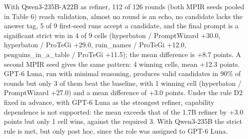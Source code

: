 \documentclass{ieeeaccess}
\begin{document}
\begin{table}[htbp]
\centering
\footnotesize
\caption{Refiner capability on the nine Tier-1 seed-42 cells; the target stays Qwen3-1.7B. Validated is the share of rounds reaching validation. Runs changed, strict wins and the strict mean refer to the final prompt versus P0 under strict extraction; the last two columns give wins/losses and the mean difference under lenient extraction. Rows marked † pool up to three MPIR seeds, the others use MPIR seed 1 only; read the † rows as pooled and not as seed-1 results.}
\end{table}

With Qwen3-235B-A22B as refiner, 112 of 126 rounds (both MPIR seeds pooled in Table 6) reach validation, almost no round is an echo, no candidate lacks the answer tag, 5 of 9 first-seed runs accept a candidate, and the final prompt is a significant strict win in 4 of 9 cells (hyperbaton / PromptWizard +30.0, hyperbaton / ProTeGi +29.0, ruin\_\allowbreak{}names / ProTeGi +12.0, penguins\_\allowbreak{}in\_\allowbreak{}a\_\allowbreak{}table / ProTeGi +11.5); the mean difference is +8.7 points. A second MPIR seed gives the same pattern: 4 winning cells, mean +12.3 points. GPT-6 Luna, run with minimal reasoning, produces valid candidates in 90\% of rounds but only 3 of them beat the baseline, with 1 winning cell (hyperbaton / PromptWizard +27.0) and a mean difference of +3.0 points. Under the rule D2 fixed in advance, with GPT-6 Luna as the strongest refiner, capability dependence is not supported: the mean exceeds that of the 1.7B refiner by +3.0 points but only 1 cell wins, against the required 3. With Qwen3-235B the strict rule is met, but only post hoc, since the role was assigned to GPT-6 Luna.
\end{document}
